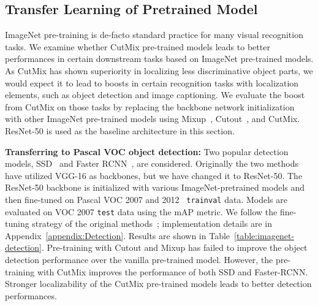 
\subsection{Transfer Learning of Pretrained Model}
\label{sec:transfer}

ImageNet pre-training is de-facto standard practice for many visual recognition tasks.
We examine whether CutMix pre-trained models leads to better performances in certain downstream tasks based on ImageNet pre-trained models.
As CutMix has shown superiority in localizing less discriminative object parts, we would expect it to lead to boosts in certain recognition tasks with localization elements, such as object detection and image captioning.
We evaluate the boost from CutMix on those tasks by replacing the backbone network initialization with other ImageNet pre-trained models using Mixup~\cite{zhang2017mixup}, Cutout~\cite{devries2017cutout}, and CutMix.
ResNet-50 is used as the baseline architecture in this section. 

\noindent\textbf{
Transferring to Pascal VOC object detection: 
}
Two popular detection models, SSD~\cite{liu2016ssd} and Faster RCNN~\cite{fasterrcnn}, are considered.
Originally the two methods have utilized VGG-16 as backbones, but we have changed it to ResNet-50.
The ResNet-50 backbone is initialized with various ImageNet-pretrained models and then fine-tuned on Pascal VOC 2007 and 2012~\cite{pascalvoc} \texttt{trainval} data. Models are evaluated on VOC 2007 \texttt{test} data using the mAP metric.
We follow the fine-tuning strategy of the original methods~\cite{liu2016ssd,fasterrcnn}; implementation details are in Appendix~\ref{appendix:Detection}. 
Results are shown in Table~\ref{table:imagenet-detection}. 
Pre-training with Cutout and Mixup has failed to improve the object detection performance over the vanilla pre-trained model. 
However, the pre-training with CutMix improves the performance of both SSD and Faster-RCNN. 
Stronger localizability of the CutMix pre-trained models leads to better detection performances.


